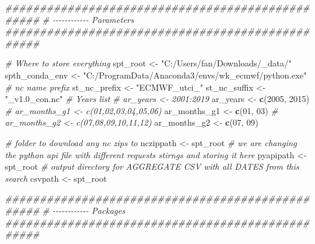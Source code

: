 \documentclass[
]{book}
\newenvironment{Shaded}{\begin{snugshade}}{\end{snugshade}}
\newcommand{\CommentTok}[1]{\textcolor[rgb]{0.56,0.35,0.01}{\textit{#1}}}
\newcommand{\DecValTok}[1]{\textcolor[rgb]{0.00,0.00,0.81}{#1}}
\newcommand{\KeywordTok}[1]{\textcolor[rgb]{0.13,0.29,0.53}{\textbf{#1}}}
\newcommand{\NormalTok}[1]{#1}
\newcommand{\StringTok}[1]{\textcolor[rgb]{0.31,0.60,0.02}{#1}}
\begin{document}
\begin{Shaded}
\begin{Highlighting}[]
\CommentTok{\#\#\#\#\#\#\#\#\#\#\#\#\#\#\#\#\#\#\#\#\#\#\#\#\#\#\#\#\#\#\#\#\#\#\#\#\#\#\#\#\#\#\#\#\#\#\#\#\#}
\CommentTok{\# {-}{-}{-}{-}{-}{-}{-}{-}{-}{-}{-}{-} Parameters}
\CommentTok{\#\#\#\#\#\#\#\#\#\#\#\#\#\#\#\#\#\#\#\#\#\#\#\#\#\#\#\#\#\#\#\#\#\#\#\#\#\#\#\#\#\#\#\#\#\#\#\#\#}

\CommentTok{\# Where to store everything}
\NormalTok{spt\_root \textless{}{-}}\StringTok{ "C:/Users/fan/Downloads/\_data/"}
\NormalTok{spth\_conda\_env \textless{}{-}}\StringTok{ "C:/ProgramData/Anaconda3/envs/wk\_ecmwf/python.exe"}
\CommentTok{\# nc name prefix}
\NormalTok{st\_nc\_prefix \textless{}{-}}\StringTok{ "ECMWF\_utci\_"}
\NormalTok{st\_nc\_suffix \textless{}{-}}\StringTok{ "\_v1.0\_con.nc"}
\CommentTok{\# Years list}
\CommentTok{\# ar\_years \textless{}{-} 2001:2019}
\NormalTok{ar\_years \textless{}{-}}\StringTok{ }\KeywordTok{c}\NormalTok{(}\DecValTok{2005}\NormalTok{, }\DecValTok{2015}\NormalTok{)}
\CommentTok{\# ar\_months\_g1 \textless{}{-} c(\textquotesingle{}01\textquotesingle{},\textquotesingle{}02\textquotesingle{},\textquotesingle{}03\textquotesingle{},\textquotesingle{}04\textquotesingle{},\textquotesingle{}05\textquotesingle{},\textquotesingle{}06\textquotesingle{})}
\NormalTok{ar\_months\_g1 \textless{}{-}}\StringTok{ }\KeywordTok{c}\NormalTok{(}\StringTok{\textquotesingle{}01\textquotesingle{}}\NormalTok{, }\StringTok{\textquotesingle{}03\textquotesingle{}}\NormalTok{)}
\CommentTok{\# ar\_months\_g2 \textless{}{-} c(\textquotesingle{}07\textquotesingle{},\textquotesingle{}08\textquotesingle{},\textquotesingle{}09\textquotesingle{},\textquotesingle{}10\textquotesingle{},\textquotesingle{}11\textquotesingle{},\textquotesingle{}12\textquotesingle{})}
\NormalTok{ar\_months\_g2 \textless{}{-}}\StringTok{ }\KeywordTok{c}\NormalTok{(}\StringTok{\textquotesingle{}07\textquotesingle{}}\NormalTok{, }\StringTok{\textquotesingle{}09\textquotesingle{}}\NormalTok{)}


\CommentTok{\# folder to download any nc zips to}
\NormalTok{nczippath \textless{}{-}}\StringTok{ }\NormalTok{spt\_root}
\CommentTok{\# we are changing the python api file with different requests stirngs and storing it here}
\NormalTok{pyapipath \textless{}{-}}\StringTok{ }\NormalTok{spt\_root}
\CommentTok{\# output directory for AGGREGATE CSV with all DATES from this search}
\NormalTok{csvpath \textless{}{-}}\StringTok{ }\NormalTok{spt\_root}

\CommentTok{\#\#\#\#\#\#\#\#\#\#\#\#\#\#\#\#\#\#\#\#\#\#\#\#\#\#\#\#\#\#\#\#\#\#\#\#\#\#\#\#\#\#\#\#\#\#\#\#\#}
\CommentTok{\# {-}{-}{-}{-}{-}{-}{-}{-}{-}{-}{-}{-} Packages}
\CommentTok{\#\#\#\#\#\#\#\#\#\#\#\#\#\#\#\#\#\#\#\#\#\#\#\#\#\#\#\#\#\#\#\#\#\#\#\#\#\#\#\#\#\#\#\#\#\#\#\#\#}


\end{Highlighting}
\end{Shaded}
\end{document}

